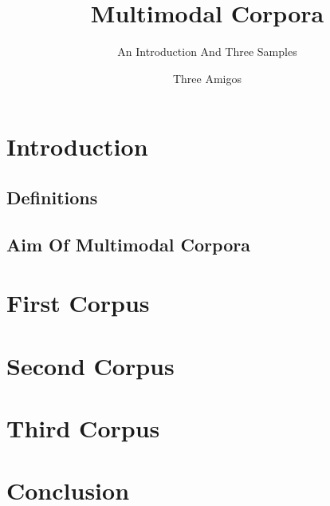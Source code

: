 \documentclass[a4]{scrartcl}
\title{Multimodal Corpora}
\subtitle{An Introduction And Three Samples}
\author{Three Amigos}
\begin{document}
	\maketitle
	

	\section{Introduction}
	
		\subsection{Definitions}
		
		\subsection{Aim Of Multimodal Corpora}
		
		
	\section{First Corpus}
	
	
	\section{Second Corpus}
	
	
	\section{Third Corpus}
	
	
	\section{Conclusion}
\end{document}
